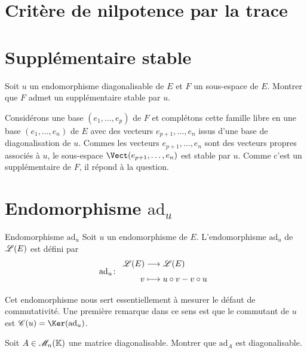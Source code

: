 \section{Critère de nilpotence par la trace} 


\section{Supplémentaire stable}

\begin{exercice}
    Soit $u$ un endomorphisme diagonalisable de $E$ et $F$ un sous-espace de $E$. Montrer que $F$ admet un supplémentaire stable par $u$. 
\end{exercice}

\begin{solution}
    Considérons une base $(e_1, \dots, e_p)$ de $F$ et complétons cette famille libre en une base $(e_1, \dots, e_n)$ de $E$ avec des vecteurs $e_{p+1}, \dots, e_n$ issus d'une base de diagonalisation de $u$. Commes les vecteurs $e_{p+1}, \dots, e_n$ sont des vecteurs propres associés à $u$, le sous-espace $\Vect(e_{p+1}, \dots, e_n)$ est stable par $u$. Comme c'est un supplémentaire de $F$, il répond à la question. 
\end{solution} 

\section{Endomorphisme \texorpdfstring{$\mathrm{ad}_u$}{ad_u}}
\begin{defi}{Endomorphisme $\mathrm{ad}_u$}
    Soit $u$ un endomorphisme de $E$. L'endomorphisme $\mathrm{ad}_u$ de $\mathscr{L}(E)$ est défini par
    $$
        \fonction[\mathrm{ad}_u]{\Endo(E)}{\Endo(E)}{v}{u \circ v - v \circ u}
    $$
\end{defi}

Cet endomorphisme nous sert essentiellement à mesurer le défaut de commutativité. Une première remarque dans ce sens est que le commutant de $u$ est $\mathscr{C}(u) = \Ker(\mathrm{ad}_u)$. 

\begin{exercice}
    Soit $A \in \mathscr{M}_n(\mathbb{K})$ une matrice diagonalisable. Montrer que $\mathrm{ad}_A$ est diagonalisable.
\end{exercice}

